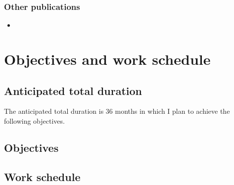 \documentclass[a4paper,11pt]{article} %
\begin{document}
\subsubsection{Other publications}

\begin{itemize}
  \item {}
\end{itemize}

\section{Objectives and work schedule}

\subsection{Anticipated total duration}

The anticipated total duration is 36 months in which I plan to achieve the following objectives.

\subsection{Objectives}

\subsection{Work schedule}\label{sec:work schedule}
%
\end{document}
